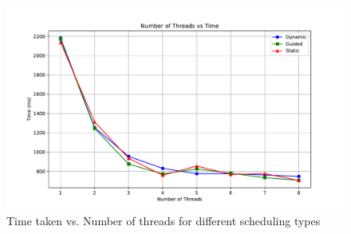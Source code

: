 \documentclass[12pt]{article}
\begin{document}
\newpage
\subsection{}
\begin{figure}[ht]
    \centering
    \includegraphics[width = \textwidth]{task4.pdf}
    \caption{Time taken vs. Number of threads for different scheduling types}
\end{figure}
\end{document}

